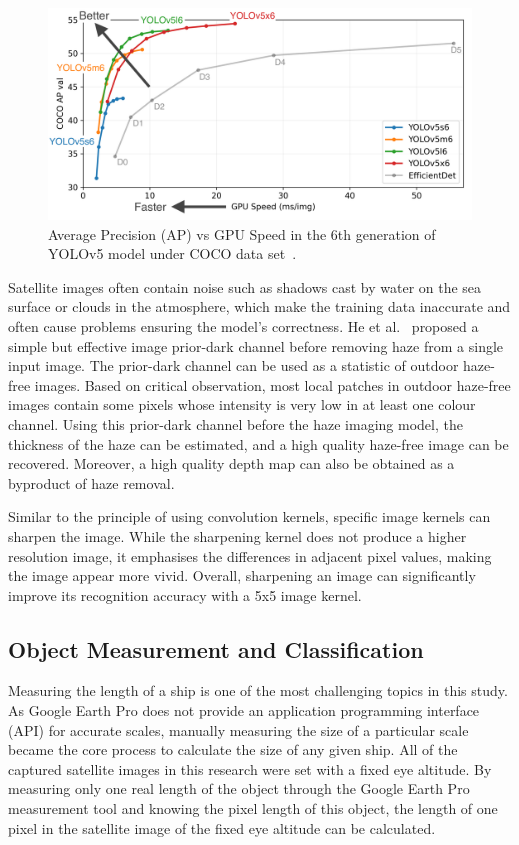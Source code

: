 \begin{figure}[!t]
    \center
    \includegraphics[width=\columnwidth]{img/YOLOv5_Performance.png}
    \caption{{Average Precision (AP) vs GPU Speed in the 6th generation of YOLOv5 model under COCO data set~\cite{glenn_jocher_2020_4154370}.}}
    \label{fig:YOLOv5_Performance}
\end{figure}


Satellite images often contain noise such as shadows cast by water on the sea surface or clouds in the atmosphere, which make the training data inaccurate and often cause problems ensuring the model's correctness. He et al.~\cite{He2009SingleIH} proposed a simple but effective image prior-dark channel before removing haze from a single input image. The prior-dark channel can be used as a statistic of outdoor haze-free images. Based on critical observation, most local patches in outdoor haze-free images contain some pixels whose intensity is very low in at least one colour channel. Using this prior-dark channel before the haze imaging model, the thickness of the haze can be estimated, and a high quality haze-free image can be recovered. Moreover, a high quality depth map can also be obtained as a byproduct of haze removal.

Similar to the principle of using convolution kernels, specific image kernels can sharpen the image. While the sharpening kernel does not produce a higher resolution image, it emphasises the differences in adjacent pixel values, making the image appear more vivid. Overall, sharpening an image can significantly improve its recognition accuracy with a 5x5 image kernel.

\subsection{Object Measurement and Classification}
Measuring the length of a ship is one of the most challenging topics in this study. As Google Earth Pro does not provide an application programming interface (API) for accurate scales, manually measuring the size of a particular scale became the core process to calculate the size of any given ship. All of the captured satellite images in this research were set with a fixed eye altitude. By measuring only one real length of the object through the Google Earth Pro measurement tool and knowing the pixel length of this object, the length of one pixel in the satellite image of the fixed eye altitude can be calculated.

